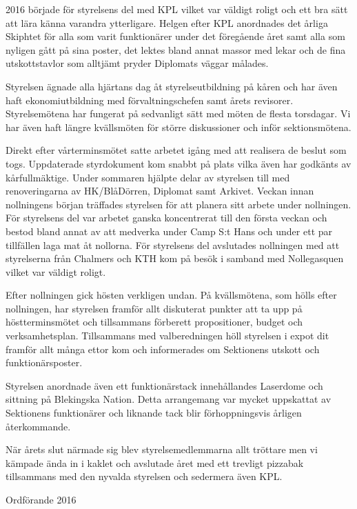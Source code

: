 \documentclass[../_main/handlingar.tex]{subfiles}
\begin{document}
2016 började för styrelsens del med KPL vilket var väldigt roligt och ett bra sätt att lära känna varandra ytterligare. Helgen efter KPL anordnades det årliga Skiphtet för alla som varit funktionärer under det föregående året samt alla som nyligen gått på sina poster, det lektes bland annat massor med lekar och de fina utskottstavlor som alltjämt pryder Diplomats väggar målades.

Styrelsen ägnade alla hjärtans dag åt styrelseutbildning på kåren och har även haft ekonomiutbildning med förvaltningschefen samt årets revisorer. Styrelsemötena har fungerat på sedvanligt sätt med möten de flesta torsdagar. Vi har även haft längre kvällsmöten för större diskussioner och inför sektionsmötena.

Direkt efter vårterminsmötet satte arbetet igång med att realisera de beslut som togs. Uppdaterade styrdokument kom snabbt på plats vilka även har godkänts av kårfullmäktige. Under sommaren hjälpte delar av styrelsen till med renoveringarna av HK/BlåDörren, Diplomat samt Arkivet. Veckan innan nollningens början träffades styrelsen för att planera sitt arbete under nollningen. För styrelsens del var arbetet ganska koncentrerat till den första veckan och bestod bland annat av att medverka under Camp S:t Hans och under ett par tillfällen laga mat åt nollorna. För styrelsens del avslutades nollningen med att styrelserna från Chalmers och KTH kom på besök i samband med Nollegasquen vilket var väldigt roligt.

Efter nollningen gick hösten verkligen undan. På kvällsmötena, som hölls efter nollningen, har styrelsen framför allt diskuterat punkter att ta upp på höstterminsmötet och tillsammans förberett propositioner, budget och verksamhetsplan. Tillsammans med valberedningen höll styrelsen i expot dit framför allt många ettor kom och informerades om Sektionens utskott och funktionärsposter.

Styrelsen anordnade även ett funktionärstack innehållandes Laserdome och sittning på Blekingska Nation. Detta arrangemang var mycket uppskattat av Sektionens funktionärer och liknande tack blir förhoppningsvis årligen återkommande.

När årets slut närmade sig blev styrelsemedlemmarna allt tröttare men vi kämpade ända in i kaklet och avslutade året med ett trevligt pizzabak tillsammans med den nyvalda styrelsen och sedermera även KPL.
\begin{signatures}{1}
    \mvh
    \signature{Fredrik Peterson}{Ordförande 2016}
\end{signatures}
\end{document}
